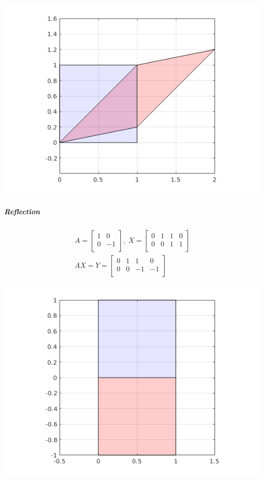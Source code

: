 \documentclass[MathsNotesBase.tex]{subfiles}
\begin{document}
{		\begin{center}
		\includegraphics[scale=0.85]{resources/img/GeometryOfMatrices_images/shearing2.png}
		\end{center}
		
		\subparagraph{Reflection}
		\begin{align*}
		A =
		\begin{bmatrix}    
		1  &  0 \\
		0  &  -1 \\		
		\end{bmatrix}
		,\; X = 
		\begin{bmatrix}  
		0   &  1  &   1  &   0 \\
		0   &  0  &   1  &   1	\\	
		\end{bmatrix} \\[10pt]
		AX = Y = 
		\begin{bmatrix}   
		0  &   1  &  1  &  0 \\
		0  &   0  &  -1  &  -1 \\
		\end{bmatrix}
		\end{align*}
	
		\begin{center}
		\includegraphics[scale=0.85]{resources/img/GeometryOfMatrices_images/reflection.png}
		\end{center}
	}
	
\end{document}
